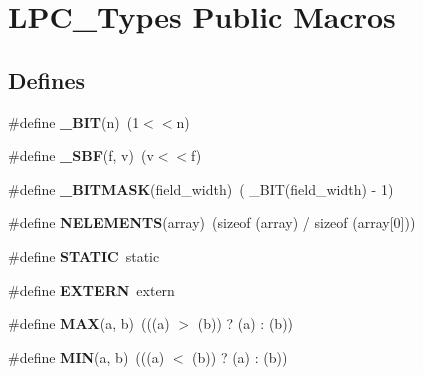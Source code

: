 \hypertarget{group___l_p_c___types___public___macros}{\section{\-L\-P\-C\-\_\-\-Types \-Public \-Macros}
\label{group___l_p_c___types___public___macros}
}
\subsection*{\-Defines}
\begin{DoxyCompactItemize}
\item 
\hypertarget{group___l_p_c___types___public___macros_ga7ee022f5e5a971a8324e4b7572d49170}{\#define {\bfseries \-\_\-\-B\-I\-T}(n)~(1$<$$<$n)}\label{group___l_p_c___types___public___macros_ga7ee022f5e5a971a8324e4b7572d49170}

\item 
\hypertarget{group___l_p_c___types___public___macros_ga6caca3483c2ce446900be05ea02e8f49}{\#define {\bfseries \-\_\-\-S\-B\-F}(f, v)~(v$<$$<$f)}\label{group___l_p_c___types___public___macros_ga6caca3483c2ce446900be05ea02e8f49}

\item 
\hypertarget{group___l_p_c___types___public___macros_ga78ad3421dde54769e8b46d36819ae87a}{\#define {\bfseries \-\_\-\-B\-I\-T\-M\-A\-S\-K}(field\-\_\-width)~( \-\_\-\-B\-I\-T(field\-\_\-width) -\/ 1)}\label{group___l_p_c___types___public___macros_ga78ad3421dde54769e8b46d36819ae87a}

\item 
\hypertarget{group___l_p_c___types___public___macros_gafdd9296176e56fcfd83c07d345a045a7}{\#define {\bfseries \-N\-E\-L\-E\-M\-E\-N\-T\-S}(array)~(sizeof (array) / sizeof (array\mbox{[}0\mbox{]}))}\label{group___l_p_c___types___public___macros_gafdd9296176e56fcfd83c07d345a045a7}

\item 
\hypertarget{group___l_p_c___types___public___macros_ga10b2d890d871e1489bb02b7e70d9bdfb}{\#define {\bfseries \-S\-T\-A\-T\-I\-C}~static}\label{group___l_p_c___types___public___macros_ga10b2d890d871e1489bb02b7e70d9bdfb}

\item 
\hypertarget{group___l_p_c___types___public___macros_ga77366c1bd428629dc898e188bfd182a3}{\#define {\bfseries \-E\-X\-T\-E\-R\-N}~extern}\label{group___l_p_c___types___public___macros_ga77366c1bd428629dc898e188bfd182a3}

\item 
\hypertarget{group___l_p_c___types___public___macros_gafa99ec4acc4ecb2dc3c2d05da15d0e3f}{\#define {\bfseries \-M\-A\-X}(a, b)~(((a) $>$ (b)) ? (a) \-: (b))}\label{group___l_p_c___types___public___macros_gafa99ec4acc4ecb2dc3c2d05da15d0e3f}

\item 
\hypertarget{group___l_p_c___types___public___macros_ga3acffbd305ee72dcd4593c0d8af64a4f}{\#define {\bfseries \-M\-I\-N}(a, b)~(((a) $<$ (b)) ? (a) \-: (b))}\label{group___l_p_c___types___public___macros_ga3acffbd305ee72dcd4593c0d8af64a4f}

\end{DoxyCompactItemize}
